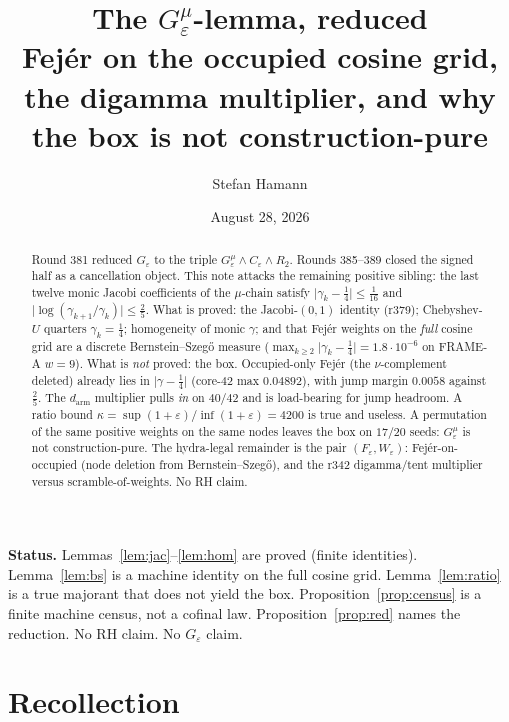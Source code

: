 \documentclass[11pt]{article}
\title{\bfseries The $G_\varepsilon^\mu$-lemma, reduced\\[2mm]
\large Fej\'er on the occupied cosine grid, the digamma multiplier,
and why the box is not construction-pure}
\author{Stefan Hamann}
\date{August 28, 2026}
\theoremstyle{remark}
\newcommand{\eps}{\varepsilon}
\begin{document}
\maketitle

\begin{abstract}\noindent
Round 381 reduced $G_\varepsilon$ to the triple
$G_\varepsilon^\mu\wedge C_\varepsilon\wedge R_2$.
Rounds 385--389 closed the signed half as a cancellation object.
This note attacks the remaining positive sibling:
the last twelve monic Jacobi coefficients of the $\mu$-chain
satisfy $\lvert\gamma_k-\tfrac14\rvert\le\tfrac1{16}$ and
$\lvert\log(\gamma_{k+1}/\gamma_k)\rvert\le\tfrac25$.
What is proved: the Jacobi-$(0,1)$ identity (r379);
Chebyshev-$U$ quarters $\gamma_k=\tfrac14$; homogeneity of monic
$\gamma$; and that Fej\'er weights on the \emph{full} cosine grid
are a discrete Bernstein--Szeg\H{o} measure
($\max_{k\ge 2}\lvert\gamma_k-\tfrac14\rvert=1.8\cdot10^{-6}$ on
FRAME-A $w=9$).
What is \emph{not} proved: the box.
Occupied-only Fej\'er (the $\nu$-complement deleted) already lies
in $\lvert\gamma-\tfrac14\rvert$ (core-$42$ max $0.04892$), with jump
margin $0.0058$ against $\tfrac25$.
The $d_{\mathrm{arm}}$ multiplier pulls \emph{in} on $40/42$ and
is load-bearing for jump headroom.
A ratio bound $\kappa=\sup(1+\eps)/\inf(1+\eps)=4200$ is true and
useless.
A permutation of the same positive weights on the same nodes
leaves the box on $17/20$ seeds: $G_\varepsilon^\mu$ is not
construction-pure.
The hydra-legal remainder is the pair $(F_\eps,W_\eps)$:
Fej\'er-on-occupied (node deletion from Bernstein--Szeg\H{o}),
and the r342 digamma/tent multiplier versus scramble-of-weights.
No RH claim.
\end{abstract}

\medskip\noindent
\textbf{Status.}\enspace
Lemmas~\ref{lem:jac}--\ref{lem:hom} are proved (finite identities).
Lemma~\ref{lem:bs} is a machine identity on the full cosine grid.
Lemma~\ref{lem:ratio} is a true majorant that does not yield the box.
Proposition~\ref{prop:census} is a finite machine census, not a
cofinal law.
Proposition~\ref{prop:red} names the reduction.
No RH claim.  No $G_\varepsilon$ claim.

\section{Recollection}\label{sec:rec}
\end{document}
